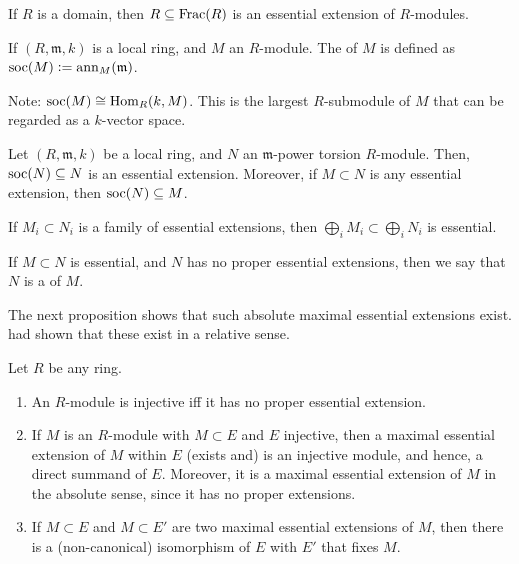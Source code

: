 \documentclass[12pt]{article}
\begin{document}
\begin{ex}
	If $R$ is a domain, then $R \subseteq \operatorname{Frac}(R)$ is an essential extension of $R$-modules.
\end{ex}

\begin{defn}
	If $(R, \mathfrak{m}, k)$ is a local ring, and $M$ an $R$-module. The  of $M$ is defined as $\operatorname{soc}(M) \vcentcolon= \operatorname{ann}_{M}(\mathfrak{m})$.
\end{defn}
Note: $\operatorname{soc}(M) \cong \operatorname{Hom}_{R}(k, M)$. This is the largest $R$-submodule of $M$ that can be regarded as a $k$-vector space. 

\begin{ex}
	Let $(R, \mathfrak{m}, k)$ be a local ring, and $N$ an $\mathfrak{m}$-power torsion $R$-module. Then, $\operatorname{soc}(N) \subseteq N$ is an essential extension. Moreover, if $M \subset N$ is any essential extension, then $\operatorname{soc}(N) \subseteq M$.
\end{ex}

\begin{exe}
	If $M_{i} \subset N_{i}$ is a family of essential extensions, then $\bigoplus_{i} M_{i} \subset \bigoplus_{i} N_{i}$ is essential.
\end{exe}

\begin{defn}
	If $M \subset N$ is essential, and $N$ has no proper essential extensions, then we say that $N$ is a  of $M$.
\end{defn}
The next proposition shows that such absolute maximal essential extensions exist.  had shown that these exist in a relative sense.

\begin{prop} \label{prop:maximal-essential-inside-injective}
	Let $R$ be any ring.
	\begin{enumerate}[label=(\alph*)]
		\item An $R$-module is injective iff it has no proper essential extension.
		\item If $M$ is an $R$-module with $M \subset E$ and $E$ injective, then a maximal essential extension of $M$ within $E$ (exists and) is an injective module, and hence, a direct summand of $E$. Moreover, it is a maximal essential extension of $M$ in the absolute sense, since it has no proper extensions.
		\item If $M \subset E$ and $M \subset E'$ are two maximal essential extensions of $M$, then there is a (non-canonical) isomorphism of $E$ with $E'$ that fixes $M$.
	\end{enumerate}
\end{prop}
\end{document}
